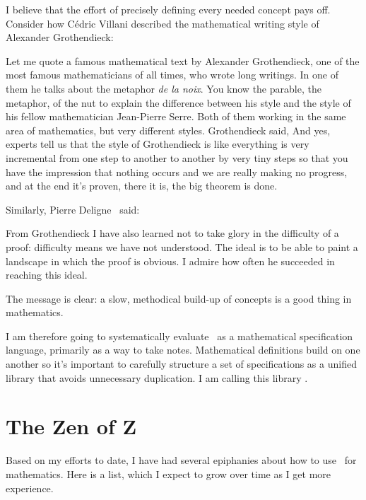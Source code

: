 \documentclass{amsart}
\begin{document}
I believe that the effort of precisely defining every needed concept pays off. 
Consider how C\'{e}dric Villani \cite{villani-hbm} described the mathematical writing style of Alexander Grothendieck:
\begin{displayquote}
Let me quote a famous mathematical text by Alexander Grothendieck, 
one of the most famous mathematicians of all times, who wrote long writings.
In one of them he talks about the metaphor \textit{de la noix}.
You know the parable, the metaphor, of the nut
to explain the difference between his style and 
the style of his fellow mathematician Jean-Pierre Serre.
Both of them working in the same area of mathematics, but very different styles. 
Grothendieck said, 
And yes, experts tell us that the style of Grothendieck is like everything is very
incremental from one step to another to
another by very tiny steps so that you
have the impression that nothing occurs
and we are really making no progress, and
at the end it's proven, there it is, the big theorem is done.
\end{displayquote}
Similarly, Pierre Deligne~\cite{artin-ag1} said:
\begin{displayquote}
From Grothendieck I have also learned not to take glory in the difficulty of a proof: 
difficulty means we have not understood.
The ideal is to be able to paint a landscape in which the proof is obvious.
I admire how often he succeeded in reaching this ideal.
\end{displayquote}
The message is clear: a slow, methodical build-up of concepts is a good thing in mathematics.

I am therefore going to systematically evaluate \ZN\ as a mathematical specification language, 
primarily as a way to take notes.
Mathematical definitions build on one another so it's important to carefully structure a set of specifications
as a unified library that avoids unnecessary duplication.
I am calling this library \mathz. 

\section{The Zen of Z}

Based on my efforts to date, I have had several epiphanies about how to use \ZN\ for mathematics.
Here is a list, which I expect to grow over time as I get more experience.
\end{document}
